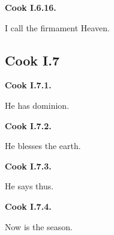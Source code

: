 \par\begin{minipage}{\linewidth}\raggedright
\textbf{Cook I.6.16.}

I call the firmament Heaven.

\end{minipage}\par\addvspace{4pt}

\subsection*{Cook I.7}

\par\begin{minipage}{\linewidth}\raggedright
\textbf{Cook I.7.1.}

He has dominion.

\end{minipage}\par\addvspace{4pt}

\par\begin{minipage}{\linewidth}\raggedright
\textbf{Cook I.7.2.}

He blesses the earth.

\end{minipage}\par\addvspace{4pt}

\par\begin{minipage}{\linewidth}\raggedright
\textbf{Cook I.7.3.}

He says thus.

\end{minipage}\par\addvspace{4pt}

\par\begin{minipage}{\linewidth}\raggedright
\textbf{Cook I.7.4.}

Now is the season.

\end{minipage}\par\addvspace{4pt}

